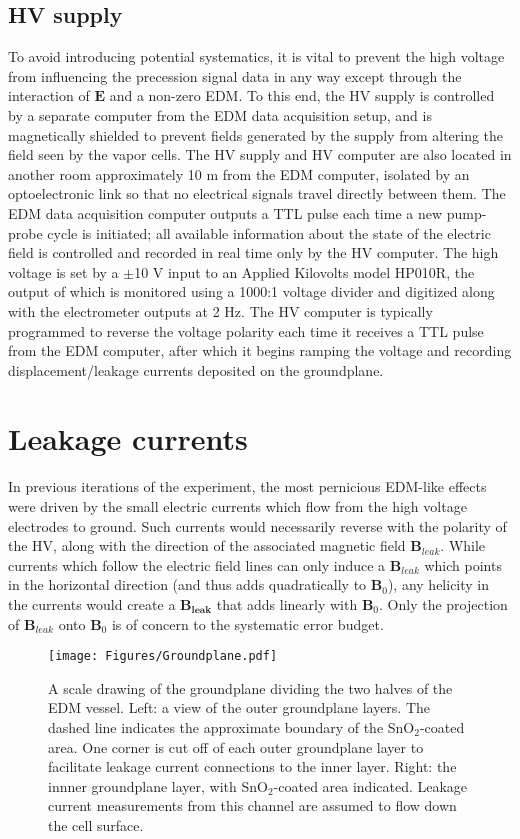 \documentclass [10pt, twoside] {uwthesis}[2012/04/02]
\begin{document}
\subsection{HV supply} 
To avoid introducing potential systematics, it is vital to prevent the high voltage from influencing the precession signal data in any way except through the interaction of $\mathbf{E}$ and a non-zero EDM. To this end, the HV supply is controlled by a separate computer from the EDM data acquisition setup, and is magnetically shielded to prevent fields generated by the supply from altering the field seen by the vapor cells. The HV supply and HV computer are also located in another room approximately 10 m from the EDM computer, isolated by an optoelectronic link so that no electrical signals travel directly between them. The EDM data acquisition computer outputs a TTL pulse each time a new pump-probe cycle is initiated; all available information about the state of the electric field is controlled and recorded in real time only by the HV computer. The high voltage is set by a $\pm$10 V input to an Applied Kilovolts model HP010R, the output of which is monitored using a 1000:1 voltage divider and digitized along with the electrometer outputs at 2 Hz. The HV computer is typically programmed to reverse the voltage polarity each time it receives a TTL pulse from the EDM computer, after which it begins ramping the voltage and recording displacement/leakage currents deposited on the groundplane.

\section{Leakage currents} \label{Leakage_methodology}
In previous iterations of the experiment, the most pernicious EDM-like effects were driven by the small electric currents which flow from the high voltage electrodes to ground. Such currents would necessarily reverse with the polarity of the HV, along with the direction of the associated magnetic field $\mathbf{B}_{leak}$. While currents which follow the electric field lines can only induce a $\mathbf{B}_{leak}$ which points in the horizontal direction (and thus adds quadratically to $\mathbf{B}_0$), any helicity in the currents would create a $\mathbf{B_{leak}}$ that adds linearly with $\mathbf{B}_0$. Only the projection of $\mathbf{B}_{leak}$ onto $\mathbf{B}_0$ is of concern to the systematic error budget. 

\begin{figure}
\begin{center}
\texttt{[image: Figures/Groundplane.pdf]}
\end{center}
\caption[Scale drawing of fused silica groundplane]%
{\narrower A scale drawing of the groundplane dividing the two halves of the EDM vessel. Left: a view of the outer groundplane layers. The dashed line indicates the approximate boundary of the SnO$_2$-coated area. One corner is cut off of each outer groundplane layer to facilitate leakage current connections to the inner layer. Right: the innner groundplane layer, with SnO$_2$-coated area indicated. Leakage current measurements from this channel are assumed to flow down the cell surface.}
\label{GroundplaneDiagram}
\end{figure}
\end{document}
